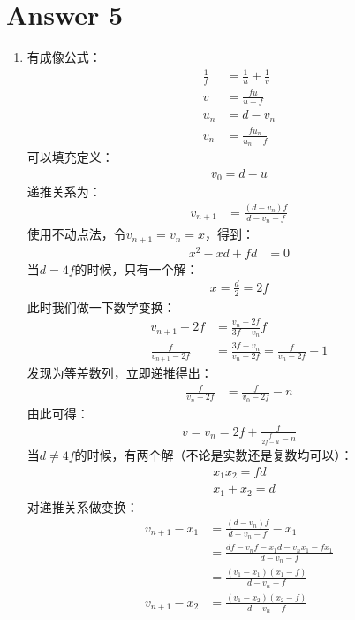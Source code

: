\section*{Answer 5}
\begin{enumerate}
	\item 有成像公式：
	\begin{align*}
		\frac{1}{f} &= \frac{1}{u} + \frac{1}{v} \\
		v &= \frac{fu}{u-f}\\
		u_{n} & = d-v_n \\
		v_n &= \frac{fu_{n}}{u_{n}-f} 
	\end{align*}
	可以填充定义：
	\begin{align*}
		v_0 = d - u
	\end{align*}
	递推关系为：
	\begin{align*}
		v_{n+1} &= \frac{(d-v_n)f}{d-v_n-f} 
	\end{align*}
	使用不动点法，令\(v_{n+1} = v_n = x\)，得到：
	\begin{align*}
		x^2 -  xd + fd &= 0 
	\end{align*}
	当\(d=4f\)的时候，只有一个解：
	\begin{align*}
		x = \frac{d}{2} = 2f
	\end{align*}
	此时我们做一下数学变换：
	\begin{align*}
		v_{n+1} - 2f &= \frac{v_n - 2f}{3f - v_n}f \\
		\frac{f}{v_{n+1} - 2f} &= \frac{3f - v_n}{v_n - 2f} = \frac{f}{v_n - 2f} - 1 
	\end{align*}
	发现为等差数列，立即递推得出：
	\begin{align*}
		\frac{f}{v_{n} - 2f} &= \frac{f}{v_0 -2f} - n 
	\end{align*}
	由此可得：
	\begin{align*}
		v = v_n = 2f + \frac{f}{\frac{f}{2f - u} - n} 
	\end{align*}
	当\(d \neq 4f\)的时候，有两个解（不论是实数还是复数均可以）：
	\begin{align*}
		&x_1 x_2 = fd \\
		&x_1 + x_2 = d 
	\end{align*}
	对递推关系做变换：
	\begin{align*}
		v_{n+1} -x_1 &= \frac{(d-v_n)f}{d-v_n-f} - x_1 \\
		&= \frac{df - v_n f - x_1 d - v_n x_1 - f x_1}{d-v_n-f} \\
		&= \frac{(v_1 - x_1 )(x_1 -f )}{d-v_n-f} \\
		v_{n+1} - x_2 &= \frac{(v_1 - x_2 )(x_2 -f )}{d-v_n-f} \\

\end{align*}
\end{enumerate}
